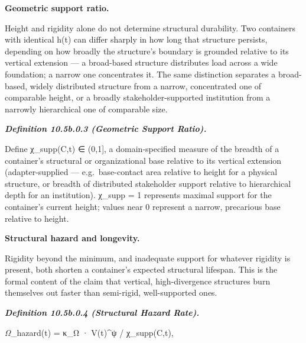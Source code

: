 \documentclass[
]{article}
\begin{document}
\textbf{Geometric support ratio.}

Height and rigidity alone do not determine structural durability. Two
containers with identical h(t) can differ sharply in how long that
structure persists, depending on how broadly the structure's boundary is
grounded relative to its vertical extension --- a broad-based structure
distributes load across a wide foundation; a narrow one concentrates it.
The same distinction separates a broad-based, widely distributed
structure from a narrow, concentrated one of comparable height, or a
broadly stakeholder-supported institution from a narrowly hierarchical
one of comparable size.

\emph{\textbf{Definition 10.5b.0.3 (Geometric Support Ratio).}}

Define χ\_supp(C,t) ∈ (0,1{]}, a domain-specified measure of the breadth
of a container's structural or organizational base relative to its
vertical extension (adapter-supplied --- e.g.~base-contact area relative
to height for a physical structure, or breadth of distributed
stakeholder support relative to hierarchical depth for an institution).
χ\_supp = 1 represents maximal support for the container's current
height; values near 0 represent a narrow, precarious base relative to
height.

\textbf{Structural hazard and longevity.}

Rigidity beyond the minimum, and inadequate support for whatever
rigidity is present, both shorten a container's expected structural
lifespan. This is the formal content of the claim that vertical,
high-divergence structures burn themselves out faster than semi-rigid,
well-supported ones.

\emph{\textbf{Definition 10.5b.0.4 (Structural Hazard Rate).}}

\emph{Ω}\_hazard(t) = κ\_Ω · V(t)\^{}ψ / χ\_supp(C,t),
\end{document}
